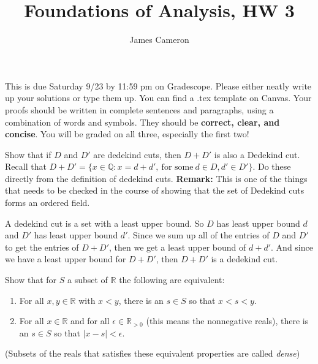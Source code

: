 \documentclass[answers]{exam}
\title{Foundations of Analysis, HW 3}
\author{James Cameron}
\date{}
\theoremstyle{remark}
\theoremstyle{definition}
\newcommand{\RR}{\mathbb{R}}
\newcommand{\QQ}{\mathbb{Q}}
\begin{document}



 This is due Saturday 9/23 by 11:59 pm on Gradescope. Please either neatly write up your solutions or type them up. You can find a .tex template on Canvas. Your proofs should be written in complete sentences and paragraphs, using a combination of words and symbols. They should be \textbf{correct, clear, and concise}. You will be graded on all three, especially the first two!

\noindent


\begin{questions}

\question Show that if $D$ and $D'$ are dedekind cuts, then $D+D'$ is also a Dedekind cut. Recall that $D+D'=\{ x\in \QQ: x= d+d', ~\textrm{for some}~ d \in D, d' \in D' \}$. Do these directly from the definition of dedekind cuts. \textbf{Remark:} This is one of the  things that needs to be checked in the course of showing that the set of Dedekind cuts forms an ordered field.

\begin{solution}

A dedekind cut is a set with a least upper bound.
So $D$ has least upper bound $d$ and $D'$ has least upper bound $d'$.
Since we sum up all of the entries of $D$ and $D'$ to get the entries of
$D + D'$, then we get a least upper bound of $d + d'$.
And since we have a least upper bound for $D + D'$,
then $D + D'$ is a dedekind cut.

\end{solution}


\question Show that for $S$ a subset of $\RR$ the following are equivalent:
\begin{enumerate}
\item For all $x,y \in \RR$ with $x<y$, there is an $s \in S$ so that $x<s<y$.
\item For all $x \in \RR$ and for all $\epsilon \in \RR_{>0}$ (this means the nonnegative reals), there is an $s \in S$ so that $|x-s|< \epsilon$.
\end{enumerate}
(Subsets of the reals that satisfies these equivalent properties are called \emph{dense})

\begin{solution}


\end{solution}
\end{questions}
\end{document}
